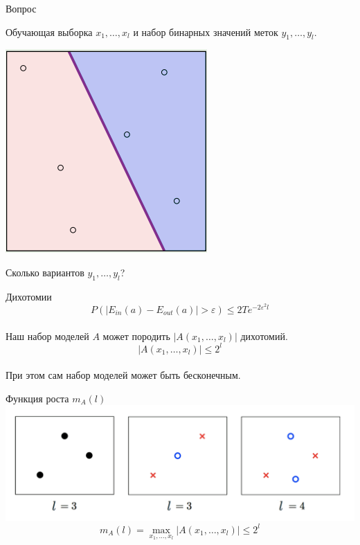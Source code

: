 \documentclass[10pt]{beamer}
\begin{document}
\begin{frame}{Вопрос}  
  \begin{minipage}[t]{0.5\linewidth}
    \begin{flushleft}
    Обучающая выборка $x_1, \dots, x_l$ и набор бинарных значений меток $y_1,\dots,y_l$.\\
    \end{flushleft}
  \end{minipage}%
  \begin{minipage}{0.5\linewidth}
      \centering
        \includegraphics[width=0.8 \textwidth, keepaspectratio]{images/dich}    
  \end{minipage}%
  \centering  
  \bigbreak
  Сколько вариантов $y_1,\dots, y_l$? 
\end{frame}

{
\begin{frame}{Дихотомии}  
  $$P(\vert E_{in}(a) - E_{out}(a) \vert > \varepsilon) \leq 2 T e^{-2\varepsilon^2l}$$  \\
  \bigbreak
  Наш набор моделей $A$ может породить $\vert A(x_1,\dots, x_l) \vert$ дихотомий.\\
  $$\vert A(x_1,\dots, x_l) \vert \leq 2^l$$\\
  При этом сам набор моделей может быть бесконечным.
\end{frame}
}

\begin{frame}{Функция роста $m_{A}(l)$}  
  \centering
  \includegraphics[width=\textwidth, keepaspectratio]{images/growth}
  $$m_{A}(l) = \max\limits_{x_1,\dots,x_l} \vert A(x_1,\dots, x_l) \vert \leq 2^l$$\\
\end{frame}
\end{document}
